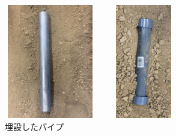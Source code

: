 \documentclass[a4paper,12pt]{jsreport}
\begin{document}

  \begin{figure}[htbp]
    \begin{minipage}[b]{0.5\linewidth}
      \centering
      \includegraphics[height=5cm,width=4cm]{dataimage/exp_image/metalpipe.jpg}
    \end{minipage}
    \begin{minipage}[b]{0.3\linewidth}
      \centering
      \includegraphics[height=5cm,width=4cm]{dataimage/exp_image/plasticpipe.jpg}
    \end{minipage}
    \caption{埋設したパイプ}
    \label{埋設したパイプ}
  \end{figure}  
\end{document}
